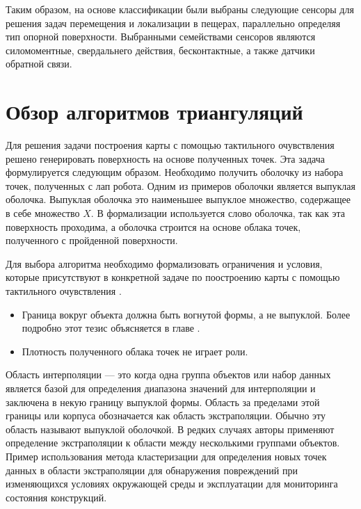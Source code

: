 Таким образом, на основе классификации были выбраны следующие сенсоры для решения задач перемещения и локализации в пещерах, параллельно определяя тип опорной поверхности. Выбранными семействами сенсоров являются силомоментные, свердальнего действия, бесконтактные, а также датчики обратной связи.

\section{Обзор алгоритмов триангуляций}
Для решения задачи построения карты с помощью тактильного очувствления решено генерировать поверхность на основе полученных точек. Эта задача формулируется следующим образом. Необходимо получить оболочку из набора точек, полученных с лап робота. Одним из примеров оболочки является выпуклая оболочка. Выпуклая оболочка это наименьшее выпуклое множество, содержащее в себе множество $X$. В формализации используется слово оболочка, так как эта поверхность проходима, а оболочка строится на основе облака точек, полученного с пройденной поверхности. 

Для выбора алгоритма необходимо формализовать ограничения и условия, которые присутствуют в конкретной задаче по поостроению карты с помощью тактильного очувствления \cite{ebertInterpolationExtrapolationComparison2014,kumarSurfaceTriangulationSurvey,aurenhammerVoronoiDiagramsSurvey1991}.
\begin{itemize}
    \item Граница вокруг объекта должна быть вогнутой формы, а не выпуклой. Более подробно этот тезис объясняется в главе .
    \item Плотность полученного облака точек не играет роли.
\end{itemize}

Область интерполяции \cite{brooksCharacterizingDomainRegression1988,patelLinearProgramDetect1995,baranyiEffectsParameterizationPerformance1996,haffnerEscapingConvexHull2001,kingDangersExtremeCounterfactuals2006} --- это когда одна группа объектов или набор данных является базой для определения диапазона значений для интерполяции и заключена в некую границу выпуклой формы. Область за пределами этой границы или корпуса обозначается как область экстраполяции. Обычно эту область называют выпуклой оболочкой. В редких случаях авторы применяют определение экстраполяции к области между несколькими группами объектов. Пример использования метода кластеризации для определения новых точек данных в области экстраполяции для обнаружения повреждений при изменяющихся условиях окружающей среды и эксплуатации для мониторинга состояния конструкций.

